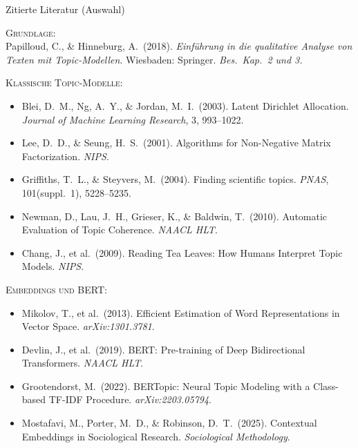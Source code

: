 \documentclass[aspectratio=169,11pt]{beamer}
\let\oldemph\emph
\renewcommand{\emph}[1]{{\color{solCyan}\oldemph{#1}}}
\begin{document}
\begin{frame}[allowframebreaks]{Zitierte Literatur (Auswahl)}

  \footnotesize

  \textsc{Grundlage:} \\[2pt]
  Papilloud, C., \& Hinneburg, A.\ (2018). \emph{Einführung in die
  qualitative Analyse von Texten mit Topic-Modellen}. Wiesbaden:
  Springer. \emph{Bes.\ Kap.\ 2 und 3.}

  \medskip
  \textsc{Klassische Topic-Modelle:}
  \begin{itemize}
    \item Blei, D.\ M., Ng, A.\ Y., \& Jordan, M.\ I.\ (2003). Latent
          Dirichlet Allocation. \emph{Journal of Machine Learning
          Research}, 3, 993–1022.
    \item Lee, D.\ D., \& Seung, H.\ S.\ (2001). Algorithms for
          Non-Negative Matrix Factorization. \emph{NIPS}.
    \item Griffiths, T.\ L., \& Steyvers, M.\ (2004). Finding scientific
          topics. \emph{PNAS}, 101(suppl.\ 1), 5228–5235.
    \item Newman, D., Lau, J.\ H., Grieser, K., \& Baldwin, T.\ (2010).
          Automatic Evaluation of Topic Coherence. \emph{NAACL HLT}.
    \item Chang, J., et al.\ (2009). Reading Tea Leaves: How Humans
          Interpret Topic Models. \emph{NIPS}.
  \end{itemize}

  \medskip
  \textsc{Embeddings und BERT:}
  \begin{itemize}
    \item Mikolov, T., et al.\ (2013). Efficient Estimation of Word
          Representations in Vector Space. \emph{arXiv:1301.3781}.
    \item Devlin, J., et al.\ (2019). BERT: Pre-training of Deep
          Bidirectional Transformers. \emph{NAACL HLT}.
    \item Grootendorst, M.\ (2022). BERTopic: Neural Topic Modeling
          with a Class-based TF-IDF Procedure. \emph{arXiv:2203.05794}.
    \item Mostafavi, M., Porter, M.\ D., \& Robinson, D.\ T.\ (2025).
          Contextual Embeddings in Sociological Research.
          \emph{Sociological Methodology}.
  \end{itemize}


\end{frame}
\end{document}
